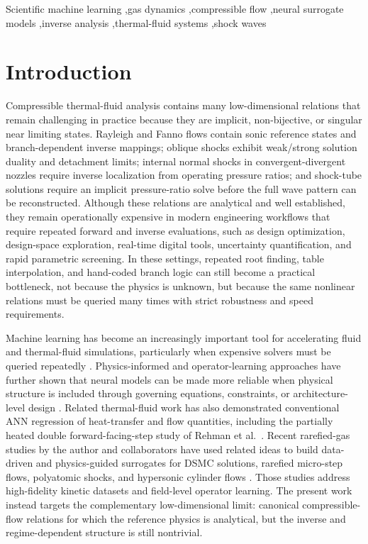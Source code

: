 \documentclass[preprint,12pt]{elsarticle}
\newcommand{\rev}[1]{#1}
\newcommand{\rev}[1]{\textcolor{revisionblue}{#1}}
\begin{document}
\begin{frontmatter}
\begin{abstract}
\end{abstract}

\begin{keyword}
Scientific machine learning \sep gas dynamics \sep compressible flow \sep neural surrogate models \sep inverse analysis \sep thermal-fluid systems \sep shock waves
\end{keyword}

\end{frontmatter}

\section{Introduction}
Compressible thermal-fluid analysis contains many low-dimensional relations that remain challenging in practice because they are implicit, non-bijective, or singular near limiting states. Rayleigh and Fanno flows contain sonic reference states and branch-dependent inverse mappings; oblique shocks exhibit weak/strong solution duality and detachment limits; internal normal shocks in convergent-divergent nozzles require inverse localization from operating pressure ratios; and shock-tube solutions require an implicit pressure-ratio solve before the full wave pattern can be reconstructed. Although these relations are analytical and well established, they remain operationally expensive in modern engineering workflows that require repeated forward and inverse evaluations, such as design optimization, design-space exploration, real-time digital tools, uncertainty quantification, and rapid parametric screening. In these settings, repeated root finding, table interpolation, and hand-coded branch logic can still become a practical bottleneck, not because the physics is unknown, but because the same nonlinear relations must be queried many times with strict robustness and speed requirements.

Machine learning has become an increasingly important tool for accelerating fluid and thermal-fluid simulations, particularly when expensive solvers must be queried repeatedly \cite{Brunton2020FluidML,Vinuesa2022CFDML,Raissi2020HiddenFluid}. Physics-informed and operator-learning approaches have further shown that neural models can be made more reliable when physical structure is included through governing equations, constraints, or architecture-level design \cite{Raissi,KarniadakisReview,DeepONet,FNO,PIDeepONet,PINO}. \rev{Related thermal-fluid work has also demonstrated conventional ANN regression of heat-transfer and flow quantities, including the partially heated double forward-facing-step study of Rehman et al.~\cite{Rehman2022}.} Recent rarefied-gas studies by the author and collaborators have used related ideas to build data-driven and physics-guided surrogates for DSMC solutions, rarefied micro-step flows, polyatomic shocks, and hypersonic cylinder flows \cite{Roohi2026DSMC,Roohi2026MicroStep,Roohi2026PoF}. Those studies address high-fidelity kinetic datasets and field-level operator learning. The present work instead targets the complementary low-dimensional limit: canonical compressible-flow relations for which the reference physics is analytical, but the inverse and regime-dependent structure is still nontrivial.
\end{document}
